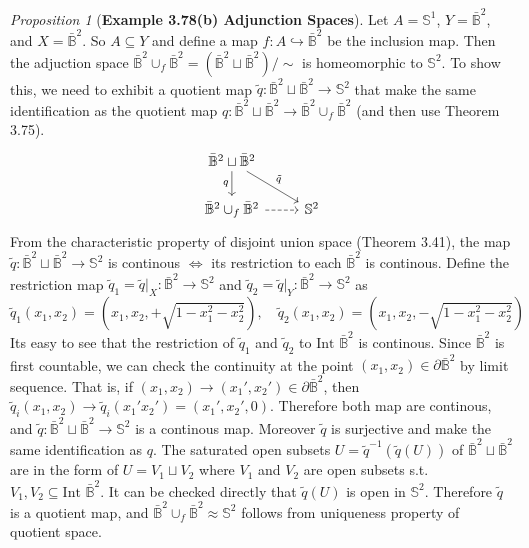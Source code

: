 \documentclass[a4paper]{article}
\theoremstyle{remark}
\newtheorem{prop}{Proposition}
\newcommand{\ssatu}{\mathbb{S}^1} %
\newcommand{\s}{\mathbb{S}} %
\newcommand{\closedball}{\bar{\mathbb{B}}} %
\newcommand{\doo}{\partial}    %
\newcommand{\subhim}{\subseteq} %
\newcommand{\Inter}{\text{Int }} %
\begin{document}
\begin{prop}[\textbf{Example 3.78(b) Adjunction Spaces}]
	Let $A=\ssatu$, $Y=\closedball^2$, and $X=\closedball^2$. So $A \subhim Y$ and define a map $f: A \hookrightarrow \closedball^2$ be the inclusion map. Then the adjuction space $\closedball ^2 \cup_f \closedball^2 = (\closedball^2 \sqcup \closedball^2)/{\sim}$ is homeomorphic to $\s^2$. To show this, we need to exhibit a quotient map $\tilde{q} : \closedball^2 \sqcup \closedball^2 \to \s^2$ that make the same identification as the quotient map $q: \closedball^2 \sqcup \closedball^2 \to \closedball ^2 \cup_f \closedball^2$ (and then use Theorem 3.75).
	\[
	\begin{tikzcd}
	\closedball^2 \sqcup \closedball^2 \arrow[d,"q",swap] \arrow[dr,"\tilde{q}"] & \\
	\closedball ^2 \cup_f \closedball^2 \arrow[r,dashrightarrow] & \s^2
	\end{tikzcd}
	\]
    From the characteristic property of disjoint union space (Theorem 3.41), the map $\tilde{q} : \closedball^2 \sqcup \closedball^2 \to \s^2$ is continous $\Leftrightarrow$ its restriction to each $\closedball^2$ is continous. Define the restriction map $\tilde{q}_1 = \tilde{q}|_X : \closedball^2 \to \s^2$ and $\tilde{q}_2 = \tilde{q}|_Y : \closedball^2 \to \s^2$ as
    $$
    \tilde{q}_1(x_1,x_2) = (x_1,x_2,+\sqrt{1-x_1^2-x_2^2}), \quad \tilde{q}_2(x_1,x_2) = (x_1,x_2,-\sqrt{1-x_1^2-x_2^2})
    $$
    Its easy to see that the restriction of $\tilde{q}_1$ and $\tilde{q}_2$ to $\Inter \closedball^2$ is continous. Since $\closedball^2$ is first countable, we can check the continuity at the point $(x_1,x_2) \in \doo \closedball^2$ by limit sequence. That is, if $(x_1,x_2) \to (x_1',x_2') \in \doo \closedball^2$, then $\tilde{q}_i(x_1,x_2) \to \tilde{q}_i(x_1'x_2')= (x_1',x_2',0)$. Therefore both map are continous, and $\tilde{q} : \closedball^2 \sqcup \closedball^2 \to \s^2$ is a continous map. Moreover $\tilde{q}$ is surjective and make the same identification as $q$. The saturated open subsets $U = \tilde{q}^{-1}(\tilde{q}(U))$ of $\closedball^2 \sqcup \closedball^2$ are in the form of $U = V_1 \sqcup V_2$ where $V_1$ and $V_2$ are open subsets s.t. $V_1,V_2\subhim \Inter \closedball^2$. It can be checked directly that $\tilde{q}(U)$ is open in $\s^2$. Therefore $\tilde{q}$ is a quotient map, and $\closedball^2 \cup_f \closedball^2 \approx \s^2$ follows from uniqueness property of quotient space.
\end{prop}
\end{document}
